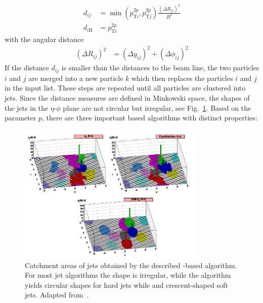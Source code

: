 \begin{align*} 
    d_{ij} &= \min(p_{\mathrm{T}i}^{2p},p_{\mathrm{T}j}^{2p})\frac{\left(\Delta
        R_{ij}\right)^2}{R^2}\\
    d_{i\mathrm{B}} &= p_{\mathrm{T}i}^{2p}
\end{align*} 
%
with the angular distance
%
\begin{align*}
    \left(\Delta R_{ij}\right)^2 &= (\Delta y_{ij})^2 + (\Delta \phi_{ij})^2
\end{align*} 
%
If the distance $d_{ij}$ is smaller than the distances to the beam line, the two
particles $i$ and $j$ are merged into a new particle $k$ which then replaces the
particles $i$ and $j$ in the input list. These steps are repeated until all
particles are clustered into jets. Since the distance measures are defined in
Minkowski space, the shapes of the jets in the $\eta$-$\phi$ plane are not circular but
irregular, see Fig.~\ref{fig:jet_shapes}. Based on the parameter $p$, there
are three important \kt based algorithms with distinct properties:

\begin{figure}[tbp]
    \centering
    \includegraphics[width=0.8\textwidth]{figures/theoretical_foundations/jet_shapes.pdf}
    \caption[Jet areas of various jet algorithms]{Catchment areas of jets
        obtained by the described \kt-based algorithm. For most jet algorithms the shape is
        irregular, while the \antikt algorithm yields circular shapes for hard
        jets while and crescent-shaped soft jets. Adapted
        from~\cite{Salam:2009jx}.}
    \label{fig:jet_shapes}
\end{figure}

